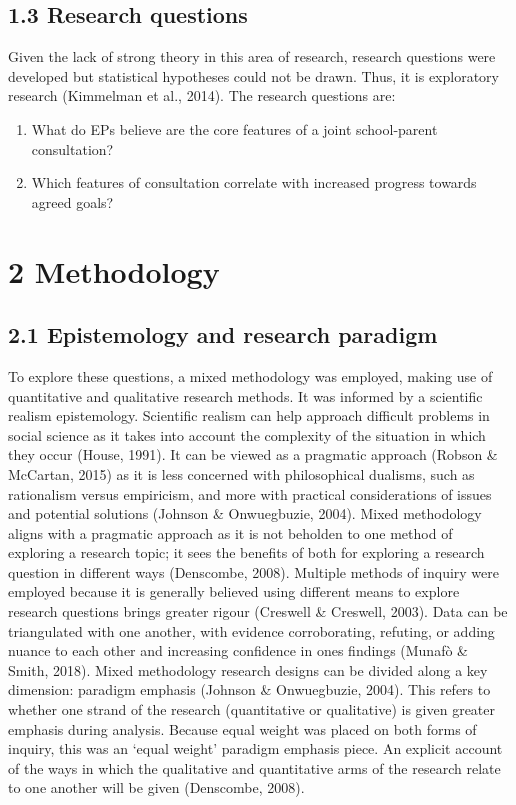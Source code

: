 \documentclass[
  english,
  man]{apa7}
\begin{document}
\hypertarget{research-questions}{%
\subsection{1.3 Research questions}\label{research-questions}}

Given the lack of strong theory in this area of research, research questions were developed but statistical hypotheses could not be drawn. Thus, it is exploratory research (Kimmelman et al., 2014). The research questions are:

\begin{enumerate}
\def\labelenumi{\arabic{enumi}.}
\item
  What do EPs believe are the core features of a joint school-parent
  consultation?
\item
  Which features of consultation correlate with increased progress
  towards agreed goals?
\end{enumerate}

\hypertarget{methodology}{%
\section{2 Methodology}\label{methodology}}

\hypertarget{epistemology-and-research-paradigm}{%
\subsection{2.1 Epistemology and research paradigm}\label{epistemology-and-research-paradigm}}

To explore these questions, a mixed methodology was employed, making use of quantitative and qualitative research methods. It was informed by a scientific realism epistemology. Scientific realism can help approach difficult problems in social science as it takes into account the complexity of the situation in which they occur (House, 1991). It can be viewed as a pragmatic approach (Robson \& McCartan, 2015) as it is less concerned with philosophical dualisms, such as rationalism versus empiricism, and more with practical considerations of issues and potential solutions (Johnson \& Onwuegbuzie, 2004). Mixed methodology aligns with a pragmatic approach as it is not beholden to one method of exploring a research topic; it sees the benefits of both for exploring a research question in different ways (Denscombe, 2008). Multiple methods of inquiry were employed because it is generally believed using different means to explore research questions brings greater rigour (Creswell \& Creswell, 2003). Data can be triangulated with one another, with evidence corroborating, refuting, or adding nuance to each other and increasing confidence in ones findings (Munafò \& Smith, 2018). Mixed methodology research designs can be divided along a key dimension: paradigm emphasis (Johnson \& Onwuegbuzie, 2004). This refers to whether one strand of the research (quantitative or qualitative) is given greater emphasis during analysis. Because equal weight was placed on both forms of inquiry, this was an `equal weight' paradigm emphasis piece. An explicit account of the ways in which the qualitative and quantitative arms of the research relate to one another will be given (Denscombe, 2008).
\end{document}
